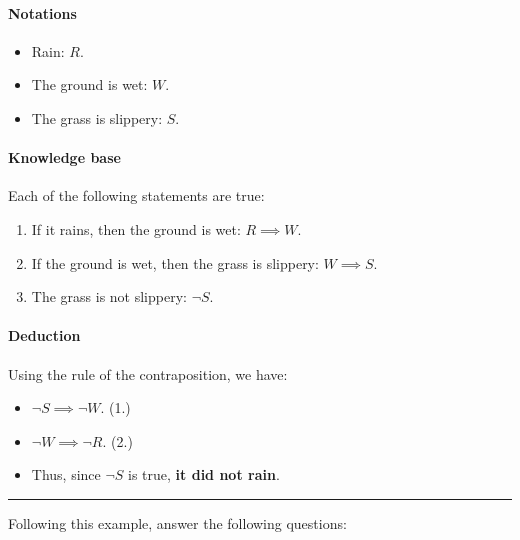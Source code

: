 \documentclass[11pt]{article}
\numberwithin{equation}{section}
\begin{document}
\paragraph{Notations}
\begin{itemize}
    \item Rain: $R$.
    \item The ground is wet: $W$.
    \item The grass is slippery: $S$.
\end{itemize}

\paragraph{Knowledge base} Each of the following statements are true:
\begin{enumerate}
    \item If it rains, then the ground is wet: $R \implies W$.
    \item If the ground is wet, then the grass is slippery: $ W \implies S$.
    \item The grass is not slippery: $\neg S$.
\end{enumerate}

\paragraph{Deduction}
Using the rule of the contraposition, we have:
\begin{itemize}
    \item[] $ \neg S \implies \neg W$. \quad\quad (1.)
    \item[] $ \neg W \implies \neg R$. \quad\quad (2.)
    \item[] Thus, since $\neg S$ is true, \textbf{it did not rain}.
\end{itemize}
\noindent\rule{\linewidth}{0.4pt}


\bigskip
Following this example, answer the following questions:
\end{document}
